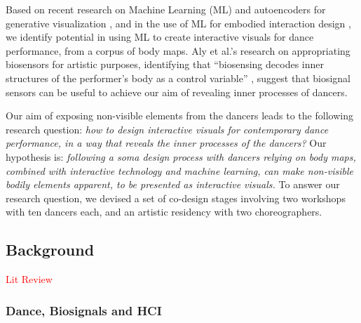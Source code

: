 Based on recent research on Machine Learning (ML) and autoencoders for generative visualization \cite{broad_autoencoding_2017, crnkovic-friis_generative_2016}, and in the use of ML for embodied interaction design \cite{plant_movement_2020}, we identify potential in using ML to create interactive visuals for dance performance, from a corpus of body maps. Aly et al.’s research on appropriating biosensors for artistic purposes, identifying that “biosensing decodes inner structures of the performer’s body as a control variable” \cite{aly_appropriating_2021}, suggest that biosignal sensors can be useful to achieve our aim of revealing inner processes of dancers.

Our aim of exposing non-visible elements from the dancers leads to the following research question: \textit{how to design interactive visuals for contemporary dance performance, in a way that reveals the inner processes of the dancers?} Our hypothesis is: \textit{following a soma design process with dancers relying on body maps, combined with interactive technology and machine learning, can make non-visible bodily elements apparent, to be presented as interactive visuals.} To answer our research question, we devised a set of co-design stages involving two workshops with ten dancers each, and an artistic residency with two choreographers.

\subsection{Background}

\textcolor{red}{Lit Review}
\subsubsection{Dance, Biosignals and HCI}

